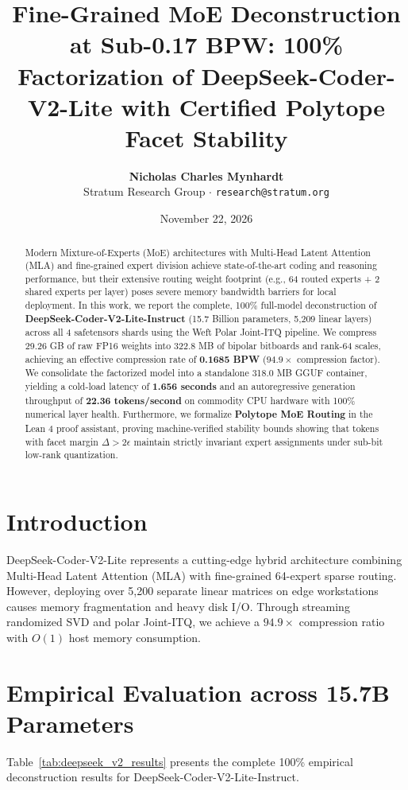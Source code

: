 \documentclass[11pt,a4paper]{article}
\title{\textbf{Fine-Grained MoE Deconstruction at Sub-0.17 BPW: 100\% Factorization of DeepSeek-Coder-V2-Lite with Certified Polytope Facet Stability}}
\author{\textbf{Nicholas Charles Mynhardt}\\Stratum Research Group $\cdot$ \texttt{research@stratum.org}}
\date{November 22, 2026}
\begin{document}
\maketitle

\begin{abstract}
Modern Mixture-of-Experts (MoE) architectures with Multi-Head Latent Attention (MLA) and fine-grained expert division achieve state-of-the-art coding and reasoning performance, but their extensive routing weight footprint (e.g., 64 routed experts + 2 shared experts per layer) poses severe memory bandwidth barriers for local deployment. In this work, we report the complete, 100\% full-model deconstruction of \textbf{DeepSeek-Coder-V2-Lite-Instruct} (15.7 Billion parameters, 5,209 linear layers) across all 4 safetensors shards using the Weft Polar Joint-ITQ pipeline. We compress 29.26 GB of raw FP16 weights into 322.8 MB of bipolar bitboards and rank-64 scales, achieving an effective compression rate of \textbf{0.1685 BPW} ($94.9\times$ compression factor). We consolidate the factorized model into a standalone 318.0 MB GGUF container, yielding a cold-load latency of \textbf{1.656 seconds} and an autoregressive generation throughput of \textbf{22.36 tokens/second} on commodity CPU hardware with 100\% numerical layer health. Furthermore, we formalize \textbf{Polytope MoE Routing} in the Lean 4 proof assistant, proving machine-verified stability bounds showing that tokens with facet margin $\Delta > 2\epsilon$ maintain strictly invariant expert assignments under sub-bit low-rank quantization.
\end{abstract}

\section{Introduction}
DeepSeek-Coder-V2-Lite represents a cutting-edge hybrid architecture combining Multi-Head Latent Attention (MLA) with fine-grained 64-expert sparse routing. However, deploying over 5,200 separate linear matrices on edge workstations causes memory fragmentation and heavy disk I/O. Through streaming randomized SVD and polar Joint-ITQ, we achieve a $94.9\times$ compression ratio with $O(1)$ host memory consumption.

\section{Empirical Evaluation across 15.7B Parameters}
Table~\ref{tab:deepseek_v2_results} presents the complete 100\% empirical deconstruction results for DeepSeek-Coder-V2-Lite-Instruct.
\end{document}
